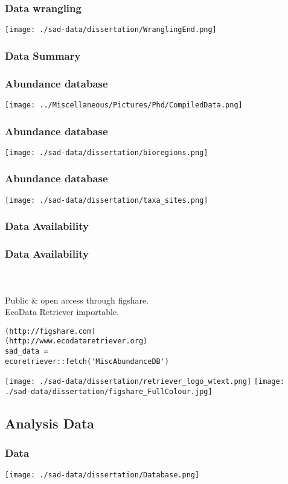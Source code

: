 \documentclass[14pt]{beamer}
\begin{document}
\begin{frame}[t]
\frametitle{Data wrangling}
\begin{center}
\texttt{[image: ./sad-data/dissertation/WranglingEnd.png]}
\end{center}
\end{frame}

\subsubsection{Data Summary}
\begin{frame}{}
\frametitle{Abundance database}
\texttt{[image: ../Miscellaneous/Pictures/Phd/CompiledData.png]}
\end{frame}

\begin{frame}{}
\frametitle{Abundance database}
\texttt{[image: ./sad-data/dissertation/bioregions.png]}
\end{frame}

\begin{frame}{}
\frametitle{Abundance database}
\texttt{[image: ./sad-data/dissertation/taxa\_sites.png]}
\end{frame}

\subsubsection{Data Availability}
\begin{frame}[fragile]
\frametitle{Data Availability}
~\\
~\\
Public \& open access through figshare.\\
EcoData Retriever importable.\\
\begin{verbatim}
(http://figshare.com)
(http://www.ecodataretriever.org)
sad_data = 
ecoretriever::fetch('MiscAbundanceDB')
\end{verbatim}
\texttt{[image: ./sad-data/dissertation/retriever\_logo\_wtext.png]}
\texttt{[image: ./sad-data/dissertation/figshare\_FullColour.jpg]}
\end{frame}

\subsection{Analysis Data}
\begin{frame}{}
\frametitle{Data}
\begin{center}
\texttt{[image: ./sad-data/dissertation/Database.png]}
\end{center}
\end{frame}
\end{document}
